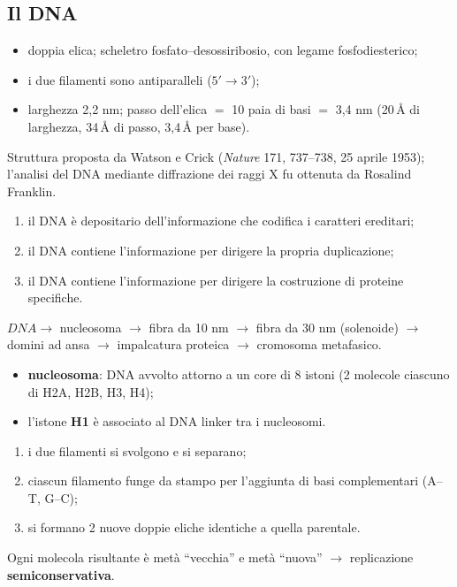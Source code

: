 \subsection{Il DNA}

\begin{itemize}
  \item doppia elica; scheletro fosfato--desossiribosio, con legame fosfodiesterico;
  \item i due filamenti sono antiparalleli ($5'\rightarrow3'$);
  \item larghezza 2,2 nm; passo dell'elica $=$ 10 paia di basi $=$ 3,4 nm (20\,\AA{} di larghezza, 34\,\AA{} di passo, 3,4\,\AA{} per base).
\end{itemize}
Struttura proposta da Watson e Crick (\textit{Nature} 171, 737--738, 25 aprile 1953); l'analisi del DNA mediante diffrazione dei raggi X fu ottenuta da Rosalind Franklin.

\begin{enumerate}
  \item il DNA è depositario dell'informazione che codifica i caratteri ereditari;
  \item il DNA contiene l'informazione per dirigere la propria duplicazione;
  \item il DNA contiene l'informazione per dirigere la costruzione di proteine specifiche.
\end{enumerate}

$DNA \rightarrow$ nucleosoma $\rightarrow$ fibra da 10 nm $\rightarrow$ fibra da 30 nm (solenoide) $\rightarrow$ domini ad ansa $\rightarrow$ impalcatura proteica $\rightarrow$ cromosoma metafasico.
\begin{itemize}
  \item \textbf{nucleosoma}: DNA avvolto attorno a un core di 8 istoni (2 molecole ciascuno di H2A, H2B, H3, H4);
  \item l'istone \textbf{H1} è associato al DNA linker tra i nucleosomi.
\end{itemize}

\begin{enumerate}
  \item i due filamenti si svolgono e si separano;
  \item ciascun filamento funge da stampo per l'aggiunta di basi complementari (A--T, G--C);
  \item si formano 2 nuove doppie eliche identiche a quella parentale.
\end{enumerate}
Ogni molecola risultante è metà ``vecchia'' e metà ``nuova'' $\rightarrow$ replicazione \textbf{semiconservativa}.


